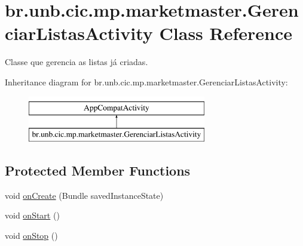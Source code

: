 \hypertarget{classbr_1_1unb_1_1cic_1_1mp_1_1marketmaster_1_1GerenciarListasActivity}{}\section{br.\+unb.\+cic.\+mp.\+marketmaster.\+Gerenciar\+Listas\+Activity Class Reference}
\label{classbr_1_1unb_1_1cic_1_1mp_1_1marketmaster_1_1GerenciarListasActivity}


Classe que gerencia as listas já criadas.  


Inheritance diagram for br.\+unb.\+cic.\+mp.\+marketmaster.\+Gerenciar\+Listas\+Activity\+:\begin{figure}[H]
\begin{center}
\leavevmode
\includegraphics[height=2.000000cm]{classbr_1_1unb_1_1cic_1_1mp_1_1marketmaster_1_1GerenciarListasActivity}
\end{center}
\end{figure}
\subsection*{Protected Member Functions}
\begin{DoxyCompactItemize}
\item 
void \mbox{\hyperlink{classbr_1_1unb_1_1cic_1_1mp_1_1marketmaster_1_1GerenciarListasActivity_abf13a16e07d4d806acf480475fca99ad}{on\+Create}} (Bundle saved\+Instance\+State)
\item 
void \mbox{\hyperlink{classbr_1_1unb_1_1cic_1_1mp_1_1marketmaster_1_1GerenciarListasActivity_a1228ba8b9e47d63da30b1940612b1cf9}{on\+Start}} ()
\item 
void \mbox{\hyperlink{classbr_1_1unb_1_1cic_1_1mp_1_1marketmaster_1_1GerenciarListasActivity_aca483d32d45ad23382fe209afdf03633}{on\+Stop}} ()
\end{DoxyCompactItemize}
